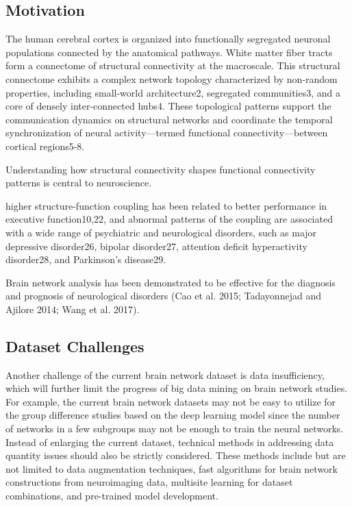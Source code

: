
\subsection{Motivation}
The human cerebral cortex is organized into functionally segregated 
neuronal populations connected by the anatomical pathways. 
White matter fiber tracts form a connectome of structural 
connectivity at the macroscale. This structural connectome exhibits 
a complex network topology characterized by non-random properties, 
including small-world architecture2, segregated 
communities3, and a core of densely inter-connected hubs4. 
These topological patterns support the communication dynamics on 
structural networks and coordinate the temporal synchronization of 
neural activity—termed functional connectivity—between cortical regions5-8.

Understanding how structural connectivity shapes functional connectivity 
patterns is central to neuroscience. 

higher structure-function coupling has been related to better performance 
in executive function10,22, and abnormal patterns of the
coupling are associated with a wide range of psychiatric and 
neurological disorders, such as major depressive disorder26, 
bipolar disorder27, attention deficit hyperactivity disorder28, 
and Parkinson’s disease29.

\cite{Chen2024}


Brain network analysis has been demonstrated to be effective for the 
diagnosis and prognosis of neurological disorders (Cao et al. 2015; Tadayonnejad
and Ajilore 2014; Wang et al. 2017). \cite{Zhang2022}

\subsection{ Dataset Challenges}
Another challenge of the current brain network
dataset is data insufficiency, which will further 
limit the progress of big data mining on brain network studies. 
For example, the current brain network datasets may not be easy 
to utilize for the group difference studies based on the deep 
learning model since the number of networks in a few subgroups 
may not be enough to train the neural networks.
Instead of enlarging the current dataset, technical methods 
in addressing data quantity issues should also be strictly 
considered. These methods include but are not limited to 
data augmentation techniques, fast algorithms for brain 
network constructions from neuroimaging data, multisite 
learning for dataset combinations, and pre-trained model
development. \cite{Tang2023}
